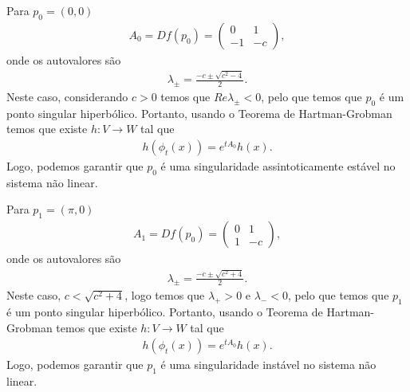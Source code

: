 \begin{frame}{}
  Para $p_0=(0,0)$
    \begin{align*}
      A_0=Df(p_0)=\begin{pmatrix}
        0 & 1 \\
        -1 & -c
      \end{pmatrix},
    \end{align*}
    onde os autovalores são
    \begin{align*}
      \lambda_{\pm}=\frac{-c\pm\sqrt{c^2-4}}{2}.
    \end{align*}
    Neste caso, considerando $c>0$ temos que $Re \lambda_{\pm}<0$, pelo que temos que $p_0$ é um ponto singular hiperbólico. Portanto, usando o Teorema de Hartman-Grobman temos que existe $h:V\to W$ tal que
    \begin{align*}
      h(\phi_t(x))=e^{tA_0}h(x).
    \end{align*}
    Logo, podemos garantir que $p_0$ é uma singularidade assintoticamente estável no sistema não linear.\\
\end{frame}

\begin{frame}{}
  
\end{frame}

\begin{frame}{}
  
\end{frame}

\begin{frame}{}
  Para $p_1=(\pi,0)$
    \begin{align*}
      A_1=Df(p_0)=\begin{pmatrix}
        0 & 1 \\
        1 & -c
      \end{pmatrix},
    \end{align*}
    onde os autovalores são
    \begin{align*}
      \lambda_{\pm}=\frac{-c\pm\sqrt{c^2+4}}{2}.
    \end{align*}
    Neste caso, $c<\sqrt{c^{2}+4}$, logo temos que $\lambda_{+}>0$ e $\lambda_{-}<0$, pelo que temos que $p_1$ é um ponto singular hiperbólico. Portanto, usando o Teorema de Hartman-Grobman temos que existe $h:V\to W$ tal que
    \begin{align*}
      h(\phi_t(x))=e^{tA_0}h(x).
    \end{align*}
    Logo, podemos garantir que $p_1$ é uma singularidade instável no sistema não linear.
\end{frame}

\begin{frame}{}
  
\end{frame}

\begin{frame}{}
  
\end{frame}
